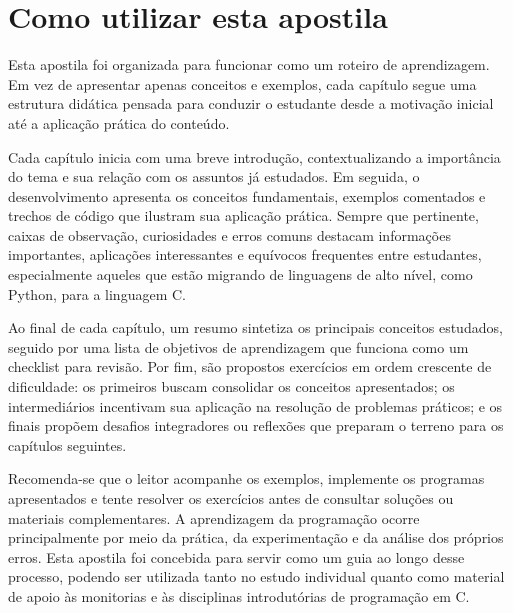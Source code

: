 \chapter*{Como utilizar esta apostila}

Esta apostila foi organizada para funcionar como um roteiro de aprendizagem. Em vez de apresentar apenas conceitos e exemplos, cada capítulo segue uma estrutura didática pensada para conduzir o estudante desde a motivação inicial até a aplicação prática do conteúdo.

Cada capítulo inicia com uma breve introdução, contextualizando a importância do tema e sua relação com os assuntos já estudados. Em seguida, o desenvolvimento apresenta os conceitos fundamentais, exemplos comentados e trechos de código que ilustram sua aplicação prática. Sempre que pertinente, caixas de observação, curiosidades e erros comuns destacam informações importantes, aplicações interessantes e equívocos frequentes entre estudantes, especialmente aqueles que estão migrando de linguagens de alto nível, como Python, para a linguagem C.

Ao final de cada capítulo, um resumo sintetiza os principais conceitos estudados, seguido por uma lista de objetivos de aprendizagem que funciona como um checklist para revisão. Por fim, são propostos exercícios em ordem crescente de dificuldade: os primeiros buscam consolidar os conceitos apresentados; os intermediários incentivam sua aplicação na resolução de problemas práticos; e os finais propõem desafios integradores ou reflexões que preparam o terreno para os capítulos seguintes.

Recomenda-se que o leitor acompanhe os exemplos, implemente os programas apresentados e tente resolver os exercícios antes de consultar soluções ou materiais complementares. A aprendizagem da programação ocorre principalmente por meio da prática, da experimentação e da análise dos próprios erros. Esta apostila foi concebida para servir como um guia ao longo desse processo, podendo ser utilizada tanto no estudo individual quanto como material de apoio às monitorias e às disciplinas introdutórias de programação em C.
